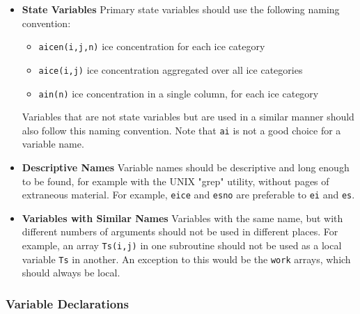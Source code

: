 \begin{itemize}
  \item {\bf State Variables} Primary state variables should use the following
         naming convention:
  \begin{itemize}
    \item {\tt aicen(i,j,n)} ice concentration for each ice category
    \item {\tt aice(i,j)} ice concentration aggregated over all ice categories
    \item {\tt ain(n)} ice concentration in a single column, for each ice category
  \end{itemize}

  Variables that are not state variables but are used in a similar manner should
  also follow this naming convention.  Note that {\tt ai} is not a good choice
  for a variable name.

  \item {\bf Descriptive Names} Variable names should be descriptive and long
        enough to be found, for example with the UNIX "grep" utility, without
        pages of extraneous material.  For example,
        {\tt eice} and {\tt esno} are preferable to {\tt ei} and {\tt es}.
 
  \item {\bf Variables with Similar Names} Variables with the same name, but
         with different numbers of arguments should not be used in different
         places.  For example, an array {\tt Ts(i,j)} in one subroutine should
         not be used as a local variable {\tt Ts} in another.  An exception
         to this would be the {\tt work} arrays, which should always be local.
\end{itemize}

\subsubsection*{Variable Declarations}

